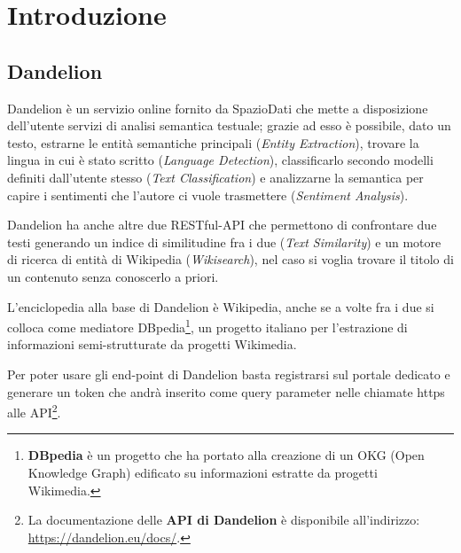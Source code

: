 \chapter{Introduzione}
\section{Dandelion}

Dandelion è un servizio online fornito da SpazioDati che mette a disposizione dell'utente servizi di analisi semantica testuale; 
grazie ad esso è possibile, dato un testo, estrarne le entità semantiche principali (\textit{Entity Extraction}\cite{entity-extraction-demo}), trovare la lingua in cui è stato 
scritto (\textit{Language Detection}), classificarlo secondo modelli definiti dall'utente stesso (\textit{Text Classification}\cite{text-classification-demo}) e analizzarne la semantica 
per capire i sentimenti che l'autore ci vuole trasmettere (\textit{Sentiment Analysis}\cite{sentiment-analysis-demo}). 

Dandelion ha anche altre due RESTful-API\cite{rest, api} che permettono di confrontare due testi generando un indice di similitudine fra i due
(\textit{Text Similarity}\cite{text-similarity-demo}) e un motore di ricerca di entità di Wikipedia (\textit{Wikisearch}), nel caso si voglia trovare il titolo 
di un contenuto senza conoscerlo a priori.

L'enciclopedia alla base di Dandelion è Wikipedia, anche se a volte fra i due si colloca come mediatore DBpedia\footnote{
    \textbf{DBpedia}\cite{dbpedia} è un progetto che ha portato alla creazione di un OKG (Open Knowledge Graph) edificato su informazioni estratte da progetti Wikimedia\cite{wikimedia}. 
}, un progetto italiano per l'estrazione di informazioni semi-strutturate da progetti Wikimedia. 

Per poter usare gli end-point di Dandelion basta registrarsi\cite{dandelion-registration} sul portale dedicato e generare un token che andrà inserito come query parameter nelle 
chiamate https alle API\footnote{
    La documentazione delle \textbf{API di Dandelion} è disponibile all'indirizzo: \href{https://dandelion.eu/docs/}{https://dandelion.eu/docs/}.
}.

